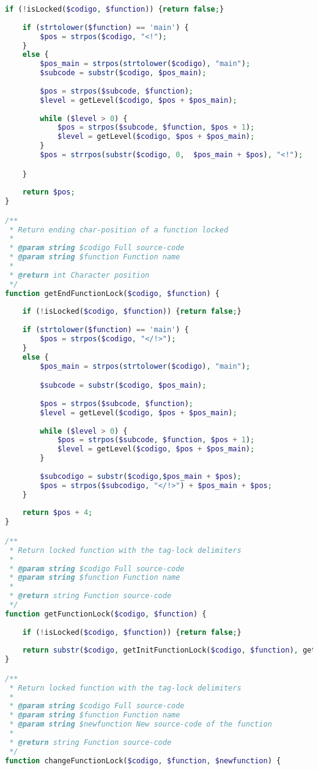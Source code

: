 \begin{lstlisting}[language=PHP]
	if (!isLocked($codigo, $function)) {return false;}
	
	if (strtolower($function) == 'main') {
		$pos = strpos($codigo, "<!");
	}
	else {
		$pos_main = strpos(strtolower($codigo), "main");
		$subcode = substr($codigo, $pos_main);
		
		$pos = strpos($subcode, $function);
		$level = getLevel($codigo, $pos + $pos_main);
		
		while ($level > 0) {
			$pos = strpos($subcode, $function, $pos + 1);
			$level = getLevel($codigo, $pos + $pos_main);
		}
		$pos = strrpos(substr($codigo, 0,  $pos_main + $pos), "<!");

	}
	
	return $pos;
}

/**
 * Return ending char-position of a function locked
 * 
 * @param string $codigo Full source-code
 * @param string $function Function name
 * 
 * @return int Character position
 */
function getEndFunctionLock($codigo, $function) {
		
	if (!isLocked($codigo, $function)) {return false;}
	
	if (strtolower($function) == 'main') {
		$pos = strpos($codigo, "</!>");
	}
	else {
		$pos_main = strpos(strtolower($codigo), "main");

		$subcode = substr($codigo, $pos_main);
		
		$pos = strpos($subcode, $function);
		$level = getLevel($codigo, $pos + $pos_main);
		
		while ($level > 0) {
			$pos = strpos($subcode, $function, $pos + 1);
			$level = getLevel($codigo, $pos + $pos_main);
		}
		
		$subcodigo = substr($codigo,$pos_main + $pos);
		$pos = strpos($subcodigo, "</!>") + $pos_main + $pos;
	}
	
	return $pos + 4;
}

/**
 * Return locked function with the tag-lock delimiters
 * 
 * @param string $codigo Full source-code
 * @param string $function Function name
 * 
 * @return string Function source-code
 */
function getFunctionLock($codigo, $function) {
	
	if (!isLocked($codigo, $function)) {return false;}
	
	return substr($codigo, getInitFunctionLock($codigo, $function), getEndFunctionLock($codigo, $function) - getInitFunctionLock($codigo, $function));
}

/**
 * Return locked function with the tag-lock delimiters
 * 
 * @param string $codigo Full source-code
 * @param string $function Function name
 * @param string $newfunction New source-code of the function
 * 
 * @return string Function source-code
 */
function changeFunctionLock($codigo, $function, $newfunction) {
	

\end{lstlisting}
